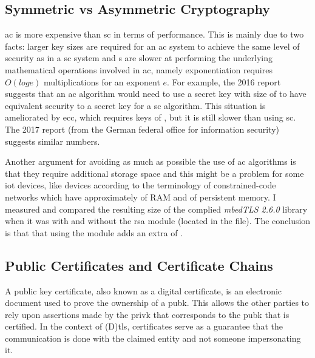 \documentclass{llncs}
\begin{document}
\subsection{Symmetric vs Asymmetric Cryptography}

\gls{ac} is more expensive than \gls{sc} in terms of performance. This is mainly due
to two facts: larger key sizes are required for an \gls{ac} system to achieve the
same level of security as in a \gls{sc} system  and s are slower at performing the underlying
mathematical operations involved in \gls{ac}, namely exponentiation requires
$O(log e)$ multiplications for an exponent $e$. For example,
the 2016  report \cite{Recommen44:online}
suggests that an \gls{ac} algorithm would need to use a secret key with size of 
to have equivalent security to a  secret key for a \gls{sc} algorithm.
This situation is ameliorated by \gls{ecc}, which requires keys of , but
it is still slower than using \gls{sc}. The 2017  report \cite{Kryptogr1:online} (from the
German federal office for information security) suggests similar numbers.

Another argument for avoiding as much as possible the use of \gls{ac}
algorithms is that they require additional storage space and this might be a problem for some \gls{iot} devices,
like  devices according to the terminology of constrained-code
networks\cite{RFC7228} which have approximately  of RAM and 
of persistent memory. I measured and compared the resulting size of the complied \textit{mbedTLS 2.6.0} library
\cite{SSLLibra13:online} when it was with and without the \gls{rsa} module
(located in the  file). The conclusion is that that using the  module adds an extra of .

\subsection{Public Certificates and Certificate Chains}

A public key certificate, also known as a digital certificate, is an electronic
document used to prove the ownership of a \gls{pubk}. This allows the other parties
to rely upon assertions made by the \gls{privk} that corresponds to the \gls{pubk}
that is certified. In the context of (D)\gls{tls}, certificates serve as a guarantee
that the communication is done with the claimed entity and not someone impersonating it.
\end{document}
